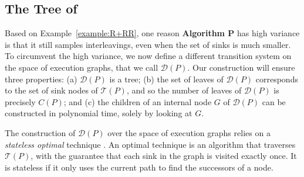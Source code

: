 \subsection{The Tree of \trust} \label{trust_sec:tree}
Based on Example~\ref{example:R+RR}, one reason \textbf{Algorithm P} has high variance is that it still samples interleavings, even when the set of sinks is much smaller. To circumvent the high variance, we now define a different transition system on the space of execution graphs, that we call
$\mathcal{D}(P)$.
Our construction will ensure three properties:
(a) $\mathcal{D}(P)$ is a tree;
(b) the set of leaves of $\mathcal{D}(P)$ corresponds to the set of sink nodes of $\mathcal{T}(P)$, and so the number of leaves
of $\mathcal{D}(P)$ is precisely $C(P)$; and 
(c) the children of an internal node $G$ of $\mathcal{D}(P)$ can be constructed in polynomial time, solely by looking at $G$.

The construction of \(\mathcal{D}(P)\) over the space of execution graphs relies on a \emph{stateless optimal \dpor} technique \cite{optimal-dpor,trust}.
An optimal \dpor technique is an algorithm that traverses $\mathcal{T}(P)$, with the guarantee that each sink in the graph is visited exactly once.
It is stateless if it only uses the current path to find the successors of a node.

%

